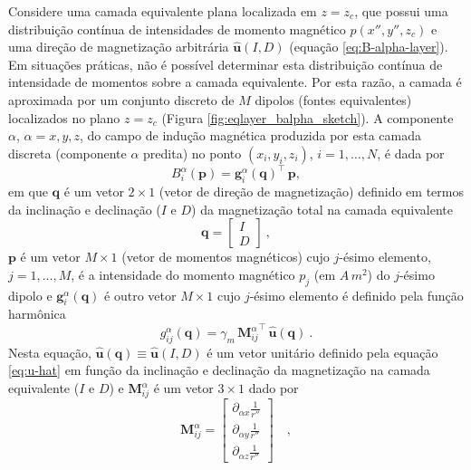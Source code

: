 Considere uma camada equivalente plana localizada em $z = z_{c}$, que possui uma distribuição 
contínua de intensidades de momento magnético $p(x'',y'',z_{c})$ e uma direção de magnetização 
arbitrária $\hat{\mathbf{u}}(I, D)$ (equação \ref{eq:B-alpha-layer}). 
Em situações práticas, não é possível determinar esta distribuição contínua de intensidade de momentos 
sobre a camada equivalente. 
Por esta razão, a camada é aproximada por um conjunto discreto de $M$ dipolos (fontes equivalentes) 
localizados no plano $z = z_{c}$ (Figura \ref{fig:eqlayer_balpha_sketch}).
A componente $\alpha$, $\alpha = x, y, z$, do campo de indução magnética produzida por esta camada 
discreta (componente $\alpha$ predita) no ponto $(x_{i},y_{i},z_{i})$, $i=1,\dots,N$, é dada por 
\begin{equation}
B^{\alpha}_{i} (\mathbf{p})  = \mathbf{g}^{\alpha}_{i}(\mathbf{q})^{\top} \, \mathbf{p},
\label{eq:B-alpha-pred-i}
\end{equation}
em que $\mathbf{q}$ é um vetor $2 \times 1$ (vetor de direção de magnetização) definido 
em termos da inclinação e declinação ($I$ e $D$) da magnetização total na camada equivalente
\begin{equation}
\mathbf{q} = \begin{bmatrix}
I \\ D 
\end{bmatrix} \: ,
\label{eq:q-vector}
\end{equation}
$\mathbf{p}$ é um vetor $M \times 1$ (vetor de momentos magnéticos) cujo $j$-ésimo elemento, $j=1,\dots,M$, 
é a intensidade do momento magnético $p_{j}$ (em $A \, m^{2}$) do $j$-ésimo dipolo e 
$\mathbf{g}^{\alpha}_{i}(\mathbf{q})$ é outro vetor $M \times 1$ cujo $j$-ésimo elemento é definido pela 
função harmônica 
\begin{equation}
g_{ij}^{\alpha}(\mathbf{q})  = \gamma_{m} \, {\mathbf{M}^{\alpha}_{ij}}^{\top} \, \hat{\mathbf{u}}(\mathbf{q}) \: .
\label{eq:g_ij-alpha}
\end{equation}
Nesta equação, $\hat{\mathbf{u}}(\mathbf{q}) \equiv \hat{\mathbf{u}}(I, D)$ é um vetor unitário
definido pela equação \ref{eq:u-hat} em função da inclinação e declinação 
da magnetização na camada equivalente ($I$ e $D$) e $\mathbf{M}^{\alpha}_{ij}$ é um vetor $3 \times 1$ 
dado por 
\begin{equation}
\mathbf{M}^{\alpha}_{ij} = \begin{bmatrix}
\partial_{\alpha x} \frac{1}{r''} \\
\partial_{\alpha y} \frac{1}{r''} \\
\partial_{\alpha z} \frac{1}{r''}
\end{bmatrix} \quad ,
\label{eq:Mij-matrix-alpha}
\end{equation}
